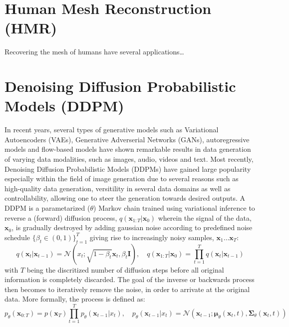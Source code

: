 \section{Human Mesh Reconstruction (HMR)}
Recovering the mesh of humans have several applications\dots

\section{Denoising Diffusion Probabilistic Models (DDPM)}

In recent years, several types of generative models such as Variational Autoencoders (VAEs), Generative Adverserial Networks (GANs), autoregressive models and flow-based models have shown remarkable results in data generation of varying data modalities, such as images, audio, videos and text. Most recently, Denoising Diffusion Probabilistic Models (DDPMs) have gained large popularity especially within the field of image generation due to several reasons such as high-quality data generation, versitility in several data domains as well as controllability, allowing one to steer the generation towards desired outputs.
A DDPM is a parametarized ($\theta$) Markov chain trained using variational inference to reverse a (forward) diffusion process, $q(\mathbf{x}_{1:T} \vert \mathbf{x}_0)$ wherein the signal of the data, $\mathbf{x}_0$, is gradually destroyed by adding gaussian noise according to predefined noise schedule $\{\beta_t  \in (0,1) \}_{t=1}^T$ giving rise to increasingly noisy samples, $\mathbf{x}_1 \ldots \mathbf{x}_T$:
\begin{equation}    
    q(\mathbf{x}_{t} \vert \mathbf{x}_{t-1}) = \mathcal{N}(x_{t}; \sqrt{1 - \beta_t}\mathbf{x}_t,\beta_t \mathbf{I} ), \quad  q(\mathbf{x}_{1:T} \vert \mathbf{x}_{0}) = \prod_{t=1}^T q(\mathbf{x}_{t} \vert \mathbf{x}_{t-1})
\end{equation}
with $T$ being the discritized number of diffusion steps before all original information is completely discarded. The goal of the inverse or backwards process then becomes to iteratively remove the noise, in order to arrivate at the original data. More formally, the process is defined as:
\begin{equation}
    p_\theta(\mathbf{x}_{0:T}) = p(\mathbf{x}_T) \prod_{t=1}^T p_\theta(\mathbf{x}_{t-1} \vert x_{t}), \quad p_\theta(\mathbf{x}_{t-1} \vert x_{t}) = \mathcal{N}(\mathbf{x}_{t-1}; \mathbf{\mu}_\theta(\mathbf{x}_t, t), \mathbf{\Sigma}_\theta(\mathbf{x}_t, t))
\end{equation}
